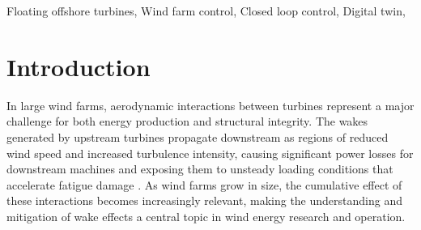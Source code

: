 \documentclass[final,5p,times,twocolumn]{elsarticle}
\begin{document}
\begin{frontmatter}
\begin{abstract}
This paper investigates the feasibility of real-time closed-loop control (CLC) for floating wind turbines in a scaled environment. FLORIDyn is employed as the control-oriented model to rapidly predict wake dynamics, while a Damage Equivalent Load (DEL) virtual sensor is integrated into the framework to estimate the fatigue loads induced by geometric yaw misalignment.
%
The proposed methodology accounts for uncertainty in wind speed and wind direction by estimating the inflow conditions from measurements obtained in a FAST.Farm simulated environment. Based on these estimates, candidate yaw settings are evaluated through a data-driven optimization framework using a cost function that simultaneously considers power production and structural fatigue loads of the wind turbines in the farm. The optimal yaw command is then selected and applied within the closed-loop control framework.
%
The control loop is designed to satisfy real-time computational requirements, achieving an execution time below 0.2~s per control iteration. These results demonstrate the feasibility of integrating fast wake modeling and virtual load sensing into a real-time control strategy for floating wind farms.

\end{abstract}



\begin{keyword}

Floating offshore turbines,
Wind farm control,
Closed loop control,
Digital twin,

\end{keyword}

\end{frontmatter}



\section{Introduction}
\label{Introduction}

In large wind farms, aerodynamic interactions between turbines represent a major challenge for both energy production and structural integrity. The wakes generated by upstream turbines propagate downstream as regions of reduced wind speed and increased turbulence intensity, causing significant power losses for downstream machines and exposing them to unsteady loading conditions that accelerate fatigue damage \cite{wake_steering_control, FLEMING2014211}. As wind farms grow in size, the cumulative effect of these interactions becomes increasingly relevant, making the understanding and mitigation of wake effects a central topic in wind energy research and operation.
\end{document}

